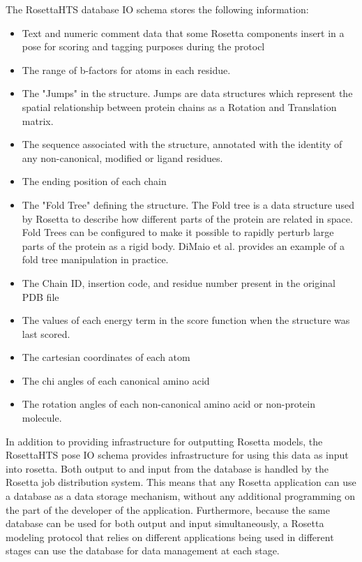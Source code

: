 The RosettaHTS database IO schema stores the following information:

\begin{itemize}
	\item Text and numeric comment data that some Rosetta components insert in a pose for scoring and tagging purposes during the protocl
	\item The range of b-factors for atoms in each residue.
	\item The "Jumps" in the structure.  Jumps are data structures which represent the spatial relationship between protein chains as a Rotation and Translation matrix.
	\item The sequence associated with the structure, annotated with the identity of any non-canonical, modified or ligand residues.
	\item The ending position of each chain
	\item The "Fold Tree" defining the structure.  The Fold tree is a data structure used by Rosetta to describe how different parts of the protein are related in space.  Fold Trees can be configured to make it possible to rapidly perturb large parts of the protein as a rigid body.  DiMaio et al.\citep{DiMaio:2011cu} provides an example of a fold tree manipulation in practice.
	\item The Chain ID, insertion code, and residue number present in the original PDB file
	\item The values of each energy term in the score function when the structure was last scored.
	\item The cartesian coordinates of each atom
	\item The chi angles of each canonical amino acid
	\item The rotation angles of each non-canonical amino acid or non-protein molecule.
\end{itemize}

In addition to providing infrastructure for outputting Rosetta models, the RosettaHTS pose IO schema provides infrastructure for using this data as input into rosetta.
Both output to and input from the database is handled by the Rosetta job distribution system.
This means that any Rosetta application can use a database as a data storage mechanism, without any additional programming on the part of the developer of the application.
Furthermore, because the same database can be used for both output and input simultaneously, a Rosetta modeling protocol that relies on different applications being used in different stages can use the database for data management at each stage.

